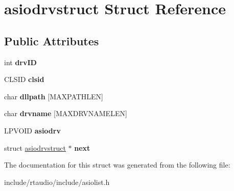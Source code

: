 \hypertarget{structasiodrvstruct}{}\section{asiodrvstruct Struct Reference}
\label{structasiodrvstruct}
\subsection*{Public Attributes}
\begin{DoxyCompactItemize}
\item 
int {\bfseries drv\+ID}\hypertarget{structasiodrvstruct_a6e427923491477ce20ad2d5e25d1e73b}{}\label{structasiodrvstruct_a6e427923491477ce20ad2d5e25d1e73b}

\item 
C\+L\+S\+ID {\bfseries clsid}\hypertarget{structasiodrvstruct_a00c997887a0aeb6dda6edbf05a3b2228}{}\label{structasiodrvstruct_a00c997887a0aeb6dda6edbf05a3b2228}

\item 
char {\bfseries dllpath} \mbox{[}M\+A\+X\+P\+A\+T\+H\+L\+EN\mbox{]}\hypertarget{structasiodrvstruct_a20f027c57dea7299c33440003114de83}{}\label{structasiodrvstruct_a20f027c57dea7299c33440003114de83}

\item 
char {\bfseries drvname} \mbox{[}M\+A\+X\+D\+R\+V\+N\+A\+M\+E\+L\+EN\mbox{]}\hypertarget{structasiodrvstruct_a4078194259da544c2e2f31cfb851ffad}{}\label{structasiodrvstruct_a4078194259da544c2e2f31cfb851ffad}

\item 
L\+P\+V\+O\+ID {\bfseries asiodrv}\hypertarget{structasiodrvstruct_a9aac49b38ce2fd520237206080fa9744}{}\label{structasiodrvstruct_a9aac49b38ce2fd520237206080fa9744}

\item 
struct \hyperlink{structasiodrvstruct}{asiodrvstruct} $\ast$ {\bfseries next}\hypertarget{structasiodrvstruct_a6e3652bb79adfd18d2b6a862de1719d0}{}\label{structasiodrvstruct_a6e3652bb79adfd18d2b6a862de1719d0}

\end{DoxyCompactItemize}


The documentation for this struct was generated from the following file\+:\begin{DoxyCompactItemize}
\item 
include/rtaudio/include/asiolist.\+h\end{DoxyCompactItemize}
